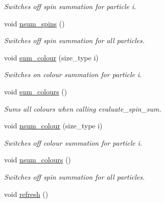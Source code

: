 \begin{DoxyCompactItemize}
\begin{DoxyCompactList}\small\item\em Switches off spin summation for particle i. \end{DoxyCompactList}\item 
\hypertarget{a00065_ac0e8919e83584a1e88fc07dc9d7263e3}{}void \hyperlink{a00065_ac0e8919e83584a1e88fc07dc9d7263e3}{nsum\+\_\+spins} ()\label{a00065_ac0e8919e83584a1e88fc07dc9d7263e3}

\begin{DoxyCompactList}\small\item\em Switches off spin summation for all particles. \end{DoxyCompactList}\item 
\hypertarget{a00065_a72f1698fd071be001fd331ac711f4e91}{}void \hyperlink{a00065_a72f1698fd071be001fd331ac711f4e91}{sum\+\_\+colour} (size\+\_\+type i)\label{a00065_a72f1698fd071be001fd331ac711f4e91}

\begin{DoxyCompactList}\small\item\em Switches on colour summation for particle i. \end{DoxyCompactList}\item 
\hypertarget{a00065_a132587c9138299ae7e2e96de48f0a076}{}void \hyperlink{a00065_a132587c9138299ae7e2e96de48f0a076}{sum\+\_\+colours} ()\label{a00065_a132587c9138299ae7e2e96de48f0a076}

\begin{DoxyCompactList}\small\item\em Sums all colours when calling evaluate\+\_\+spin\+\_\+sum. \end{DoxyCompactList}\item 
\hypertarget{a00065_a2a8a95f34f451622a28db3e5a522c697}{}void \hyperlink{a00065_a2a8a95f34f451622a28db3e5a522c697}{nsum\+\_\+colour} (size\+\_\+type i)\label{a00065_a2a8a95f34f451622a28db3e5a522c697}

\begin{DoxyCompactList}\small\item\em Switches off colour summation for particle i. \end{DoxyCompactList}\item 
\hypertarget{a00065_ab3fa6bcf41d7bfec126d24fea99357bf}{}void \hyperlink{a00065_ab3fa6bcf41d7bfec126d24fea99357bf}{nsum\+\_\+colours} ()\label{a00065_ab3fa6bcf41d7bfec126d24fea99357bf}

\begin{DoxyCompactList}\small\item\em Switches off spin summation for all particles. \end{DoxyCompactList}\item 
\hypertarget{a00065_a2a3aa7bc8efed3d4393e50c3dff4aee3}{}void \hyperlink{a00065_a2a3aa7bc8efed3d4393e50c3dff4aee3}{refresh} ()\label{a00065_a2a3aa7bc8efed3d4393e50c3dff4aee3}


\end{DoxyCompactItemize}
